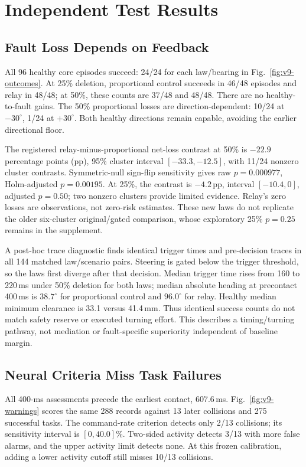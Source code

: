 \section{Independent Test Results}
\subsection{Fault Loss Depends on Feedback}
All 96 healthy core episodes succeed: 24/24 for each law/bearing in Fig.~\ref{fig:v9-outcomes}. At 25\% deletion, proportional control succeeds in 46/48 episodes and relay in 48/48; at 50\%, these counts are 37/48 and 48/48. There are no healthy-to-fault gains. The 50\% proportional losses are direction-dependent: 10/24 at $-30^\circ$, 1/24 at $+30^\circ$. Both healthy directions remain capable, avoiding the earlier directional floor.

The registered relay-minus-proportional net-loss contrast at 50\% is $-22.9$ percentage points (pp), 95\% cluster interval $[-33.3,-12.5]$, with 11/24 nonzero cluster contrasts. Symmetric-null sign-flip sensitivity gives raw $p=0.000977$, Holm-adjusted $p=0.00195$. At 25\%, the contrast is $-4.2$\,pp, interval $[-10.4,0]$, adjusted $p=0.50$; two nonzero clusters provide limited evidence. Relay's zero losses are observations, not zero-risk estimates. These new laws do not replicate the older six-cluster original/gated comparison, whose exploratory 25\% $p=0.25$ remains in the supplement.



A post-hoc trace diagnostic finds identical trigger times and pre-decision traces in all 144 matched law/scenario pairs. Steering is gated below the trigger threshold, so the laws first diverge after that decision. Median trigger time rises from 160 to 220\,ms under 50\% deletion for both laws; median absolute heading at precontact 400\,ms is $38.7^\circ$ for proportional control and $96.0^\circ$ for relay. Healthy median minimum clearance is 33.1 versus 41.4\,mm. Thus identical success counts do not match safety reserve or executed turning effort. This describes a timing/turning pathway, not mediation or fault-specific superiority independent of baseline margin.

\subsection{Neural Criteria Miss Task Failures}
All 400-ms assessments precede the earliest contact, 607.6\,ms. Fig.~\ref{fig:v9-warnings} scores the same 288 records against 13 later collisions and 275 successful tasks. The command-rate criterion detects only 2/13 collisions; its sensitivity interval is $[0,40.0]\%$. Two-sided activity detects 3/13 with more false alarms, and the upper activity limit detects none. At this frozen calibration, adding a lower activity cutoff still misses 10/13 collisions.


